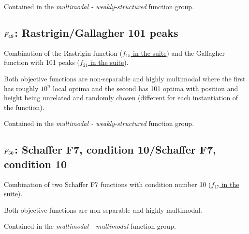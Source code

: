 Contained in the \emph{multimodal - weakly-structured} function group.



\subsection[\texorpdfstring{\protect\(F_{49}\protect\): Rastrigin/Gallagher 101 peaks}{F49: Rastrigin/Gallagher 101 peaks}]{\texorpdfstring{\protect\(F_{49}\protect\): Rastrigin/Gallagher 101 peaks}{}}
\label{index:f49}\label{index:rastrigin-gallagher-101-peaks}
Combination of the Rastrigin function
(\href{https://coco.gforge.inria.fr/downloads/download16.00/bbobdocfunctions.pdf\#page=75}{\(f_{15}\) in the \bbob suite}) and the Gallagher function with
101 peaks (\href{https://coco.gforge.inria.fr/downloads/download16.00/bbobdocfunctions.pdf\#page=105}{\(f_{21}\) in the \bbob suite}).

Both objective functions are non-separable and highly multimodal where
the first has roughly \(10^n\) local optima and the second has
101 optima with position and height being unrelated and randomly
chosen (different for each instantiation of the function).

Contained in the \emph{multimodal - weakly-structured} function group.



\subsection[\texorpdfstring{\protect\(F_{50}\protect\): Schaffer F7, condition 10/Schaffer F7, condition 10}{F50: Schaffer F7, condition 10/Schaffer F7, condition 10}]{\texorpdfstring{\protect\(F_{50}\protect\): Schaffer F7, condition 10/Schaffer F7, condition 10}{}}
\label{index:schaffer-f7-condition-10-schaffer-f7-condition-10}\label{index:f50}
Combination of two Schaffer F7 functions with
condition number 10 (\href{https://coco.gforge.inria.fr/downloads/download16.00/bbobdocfunctions.pdf\#page=85}{\(f_{17}\) in the \bbob suite}).

Both objective functions are non-separable and highly multimodal.

Contained in the \emph{multimodal - multimodal} function group.

